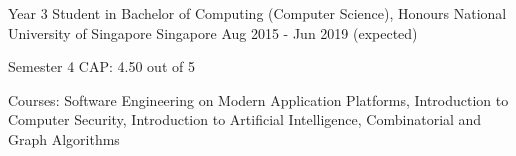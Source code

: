 

\begin{cventries}

	\cventry
	{Year 3 Student in Bachelor of Computing (Computer Science), Honours} %
	{National University of Singapore} %
	{Singapore} %
	{Aug 2015 - Jun 2019 (expected)} %
	{
		\begin{cvitems} %
		\item {Semester 4 CAP: 4.50 out of 5}
		\item {Courses: Software Engineering on Modern Application Platforms, Introduction to Computer Security, Introduction to Artificial Intelligence, Combinatorial and Graph Algorithms}
		\end{cvitems}
	}

\end{cventries}
